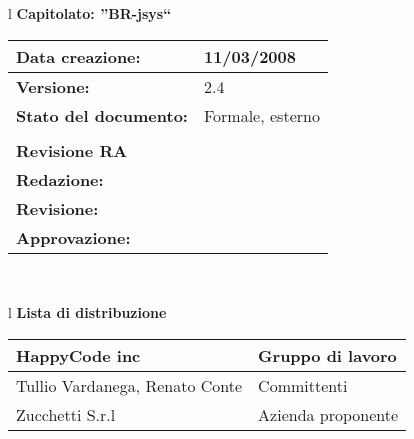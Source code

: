 

\newcommand{\lv}{ 2.4 } %
\newcommand{\dt}{ Test Report Delta }%


\begin{center}
\thispagestyle{plain}
\begin{table}[htbp]
\large{
\begin{tabular}{l}
\Large{\textbf{\textsf{Capitolato: ''BR-jsys``}}} \\
\begin{tabular}{|p{6cm}|p{6cm}|}
\hline
\textbf{Data creazione:} & 11/03/2008 \\ \hline
\textbf{Versione:} & \lv \\ \hline
\textbf{Stato del documento:} & Formale, esterno \\ \hline
& \\ \hline
\textbf{Revisione RA} & \\ \hline
\textbf{Redazione:} & \ET \\ \hline
\textbf{Revisione:} & \AT \\ \hline
\textbf{Approvazione:}  & \MT  \\ \hline
\end{tabular} \\
\end{tabular}
}
\end{table}

\begin{table}[hbtp]
\large{
\begin{tabular}{l}
\Large{\textbf{\textsf{Lista di distribuzione}}} \\
\begin{tabular}{|p{6cm}|p{6cm}|} \hline
{HappyCode inc}& Gruppo di lavoro \\ \hline
{Tullio Vardanega, Renato Conte}& Committenti \\ \hline 
{Zucchetti S.r.l}& Azienda proponente\\ \hline
\end{tabular} \\
\end{tabular}
}
\end{table}
\begin{table}[hbtp]


\end{table}
\end{center}

